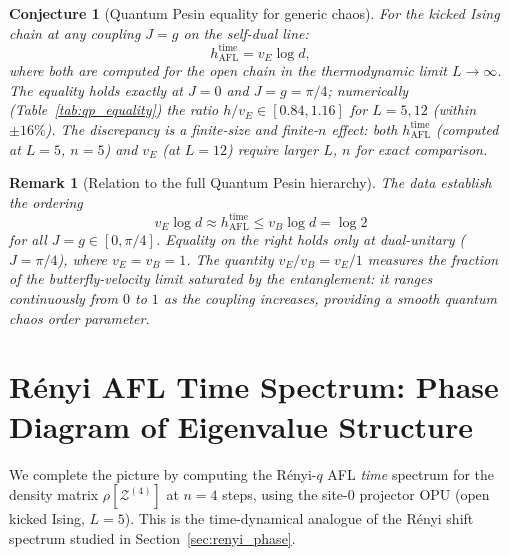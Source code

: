 \documentclass[12pt,a4paper]{article}
\newtheorem{remark}[theorem]{Remark}
\newtheorem{conjecture}[theorem]{Conjecture}
\begin{document}
\begin{conjecture}[Quantum Pesin equality for generic chaos]
  \label{conj:qp_equality}
  For the kicked Ising chain at any coupling $J=g$ on the self-dual line:
  \[
    h_{\mathrm{AFL}}^{\mathrm{time}} = v_E\log d,
  \]
  where both are computed for the open chain in the thermodynamic limit
  $L\to\infty$.  The equality holds exactly at $J=0$ and $J=g=\pi/4$;
  numerically (Table~\ref{tab:qp_equality}) the ratio $h/v_E \in [0.84, 1.16]$
  for $L=5,12$ (within $\pm 16\%$).  The discrepancy is a finite-size and
  finite-$n$ effect: both $h_{\mathrm{AFL}}^{\mathrm{time}}$ (computed at
  $L=5$, $n=5$) and $v_E$ (at $L=12$) require larger $L$, $n$ for
  exact comparison.
\end{conjecture}

\begin{remark}[Relation to the full Quantum Pesin hierarchy]
  The data establish the ordering
  \[
    v_E\log d \approx h_{\mathrm{AFL}}^{\mathrm{time}}
    \leq v_B\log d = \log 2
  \]
  for all $J=g\in[0,\pi/4]$.  Equality on the right holds only at
  dual-unitary ($J=\pi/4$), where $v_E=v_B=1$.  The quantity
  $v_E/v_B = v_E/1$ measures the fraction of the butterfly-velocity
  limit saturated by the entanglement: it ranges continuously from
  $0$ to $1$ as the coupling increases, providing a smooth quantum
  chaos order parameter.
\end{remark}

\section{R\'enyi AFL Time Spectrum: Phase Diagram of Eigenvalue Structure}
\label{sec:renyi_time_spectrum}

We complete the picture by computing the R\'enyi-$q$ AFL \emph{time} spectrum
for the density matrix $\rho[\mathcal{Z}^{(4)}]$ at $n=4$ steps, using the
site-0 projector OPU (open kicked Ising, $L=5$).  This is the time-dynamical
analogue of the Rényi shift spectrum studied in Section~\ref{sec:renyi_phase}.
\end{document}
